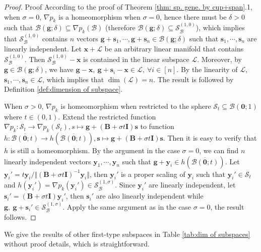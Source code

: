 \documentclass[colorlinks=true, linkcolor=blue, citecolor=blue, urlcolor=blue]{article}
\theoremstyle{plain}
\theoremstyle{definition}
\theoremstyle{remark}
\begin{document}
\begin{proof}{Proof}
    According to the proof of Theorem \ref{thm: sp. gene. by cup+span}.1, when $\sigma=0$, $\nabla p_k$ is a homeomorphism when $\sigma=0$, hence there must be $\delta>0$ such that $\mathcal{B}(\bm g;\delta)\subseteq \nabla p_k(\mathcal{B})$ (therefore $\mathcal{B}(\bm g;\delta)\subseteq\mathcal{S}_{\mathcal{B}}^{(1,0)}$), which implies that $\mathcal{S}_{\mathcal{B}}^{(1,0)}$ contains $n$ vectors $\bm g+\bm s_1,\cdots,\bm g+\bm s_n\in \mathcal{B}(\bm g;\delta)$ such that $\bm s_1,\cdots,\bm s_n$ are linearly independent. Let $\bm x+\mathcal{L}$ be an arbitrary linear manifold that contains $\mathcal{S}_{\mathcal{B}}^{(1,0)}$. Then $\mathcal{S}_{\mathcal{B}}^{(1,0)}-\bm x$ is contained in the linear subspace $\mathcal{L}$. Moreover, by $\bm g\in\mathcal{B}(\bm g;\delta)$, we have $\bm g-\bm x,\ \bm g+\bm s_i-\bm x\in\mathcal{L},\ \forall i\in[n]$. By the linearity of $\mathcal{L}$, $\bm s_1,\cdots,\bm s_n\in\mathcal{L}$, which implies that $\dim(\mathcal{L})=n$. The result is followed by Definition \ref{def:dimension of subspace}. 
    
    When $\sigma>0$, $\nabla p_k$ is homeomorphism when restricted to the sphere $\mathcal{S}_t\subseteq \mathcal{B}(\bm 0;1)$ where $t\in(0,1)$. Extend the restricted function $\nabla p_k:\mathcal{S}_t\to\nabla p_k(\mathcal{S}_t), s\mapsto \bm g+(\bm B+\sigma t\bm I)\bm s$ to function $h: \overline{\mathcal{B}(\bm 0;t)}\to h(\overline{\mathcal{B}(\bm 0;t)}), \bm s\mapsto \bm g+(\bm B+\sigma t\bm I)\bm s$. Then it is easy to verify that $h$ is still a homeomorphism. By the argument in the case $\sigma=0$, we can find $n$ linearly independent vectors $\bm y_1,\cdots,\bm y_n$ such that $\bm g+\bm y_i\in h(\overline{\mathcal{B}(\bm 0;t)})$. Let $\bm y_i'=t\bm y_i/\Vert (\bm B+\sigma t\bm I)^{-1}\bm y_i\Vert$, then $\bm y_i'$ is a proper scaling of $\bm y_i$ such that $\bm y_i'\in\mathcal{S}_t$ and $h(\bm y_i')=\nabla p_k(\bm y_i')\in\mathcal{S}_{\mathcal{B}}^{(1,\sigma)}$. Since $\bm y_i'$ are linearly independent, let $\bm s_i'=(\bm B+\sigma t\bm I)\bm y_i'$, then $\bm s_i'$ are also linearly independent while $\bm g,\ \bm g+\bm s_i'\in\mathcal{S}_{\mathcal{B}}^{(1,\sigma)}$. Apply the same argument as in the case $\sigma=0$, the result follows.
\end{proof}

 We give the results of other first-type subspaces in Table \ref{tab:dim of subspaces} without proof details, which is straightforward.
\end{document}

